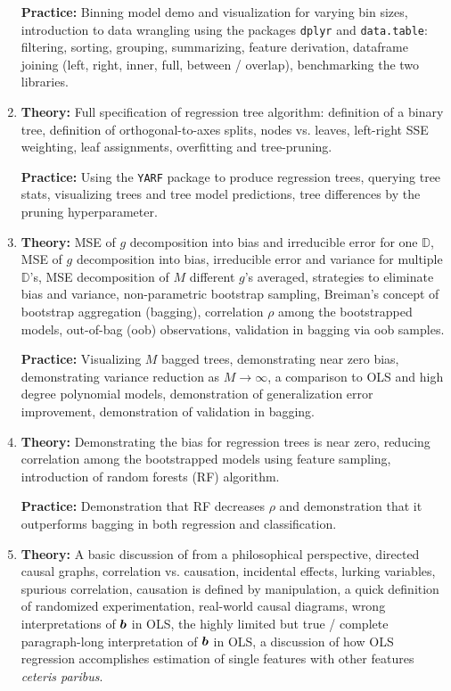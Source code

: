 \documentclass[12pt]{article}
\begin{document}
\begin{enumerate}[(1)]
\textbf{Practice:} Binning model demo and visualization for varying bin sizes, introduction to data wrangling using the packages \texttt{dplyr} and \texttt{data.table}: filtering, sorting, grouping, summarizing, feature derivation, dataframe joining (left, right, inner, full, between / overlap), benchmarking the two libraries.

\item \textbf{Theory:} Full specification of regression tree algorithm: definition of a binary tree, definition of orthogonal-to-axes splits, nodes vs. leaves, left-right SSE weighting, leaf assignments, overfitting and tree-pruning.

\textbf{Practice:} Using the \texttt{YARF} package to produce regression trees, querying tree stats, visualizing trees and tree model predictions, tree differences by the pruning hyperparameter.

\item \textbf{Theory:} MSE of $g$ decomposition into bias and irreducible error for one $\mathbb{D}$, MSE of $g$ decomposition into bias, irreducible error and variance for multiple $\mathbb{D}$'s, MSE decomposition of $M$ different $g$'s averaged, strategies to eliminate bias and variance, non-parametric bootstrap sampling, Breiman's concept of bootstrap aggregation (bagging), correlation $\rho$ among the bootstrapped models, out-of-bag (oob) observations, validation in bagging via oob samples.

\textbf{Practice:} Visualizing $M$ bagged trees, demonstrating near zero bias, demonstrating variance reduction as $M \rightarrow \infty$, a comparison to OLS and high degree polynomial models, demonstration of generalization error improvement, demonstration of validation in bagging.

\item \textbf{Theory:} Demonstrating the bias for regression trees is near zero, reducing correlation among the bootstrapped models using feature sampling, introduction of random forests (RF) algorithm.

\textbf{Practice:} Demonstration that RF decreases $\rho$ and demonstration that it outperforms bagging in both regression and classification.

\item \textbf{Theory:} A basic discussion of  from a philosophical perspective, directed causal graphs, correlation vs. causation, incidental effects, lurking variables, spurious correlation, causation is defined by manipulation, a quick definition of randomized experimentation, real-world causal diagrams, wrong interpretations of $\boldsymbol{b}$ in OLS, the highly limited but true / complete paragraph-long interpretation of $\boldsymbol{b}$ in OLS, a discussion of how OLS regression accomplishes estimation of single features with other features \emph{ceteris paribus}.


\end{enumerate}
\end{document}
